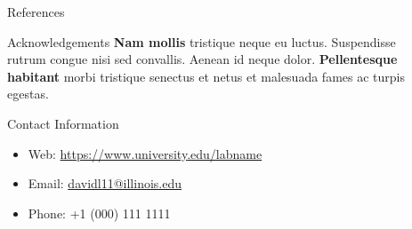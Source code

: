 \documentclass{beamer} %
\begin{document}
\begin{frame}[t]
\begin{columns}[t]
\begin{column}{0.465\textwidth}

\begin{block}{References}
	\nocite{*} %
	\small %
	\vspace{-1ex} %
\end{block}


\begin{block}{Acknowledgements}
	\textbf{Nam mollis} tristique neque eu luctus. Suspendisse rutrum congue nisi sed convallis. Aenean id neque dolor. \textbf{Pellentesque habitant} morbi tristique senectus et netus et malesuada fames ac turpis egestas.
\end{block}



\begin{block}{Contact Information}
	\begin{itemize}
		\item Web: \href{https://www.university.edu/labname}{https://www.university.edu/labname}
		\item Email: \href{mailto:davidl11@illinois.edu}{davidl11@illinois.edu}
		\item Phone: +1 (000) 111 1111
	\end{itemize}
\end{block}


\end{column} %

\begin{column}{0.02\textwidth}\end{column} %

\end{columns} %

\end{frame} %

\end{document}
